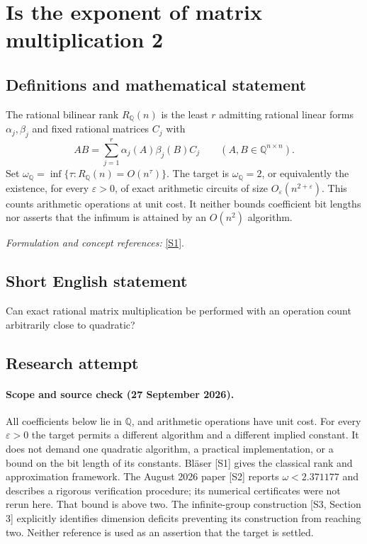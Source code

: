 \documentclass[11pt]{article}
\begin{document}
\section*{\texorpdfstring{Is the exponent of matrix multiplication 2}{Is the exponent of matrix multiplication 2}}\label{3100086}
\subsection{Definitions and mathematical statement}
The rational bilinear rank $R_{{\mathbb{Q}}}(n)$ is the least $r$ admitting rational linear forms $\alpha_j,\beta_j$ and fixed rational matrices $C_j$ with
\[
 AB=\sum_{j=1}^r\alpha_j(A)\beta_j(B)C_j\qquad(A,B\in{\mathbb{Q}}^{n\times n}).
\]
Set $\omega_{{\mathbb{Q}}}=\inf\{\tau:R_{{\mathbb{Q}}}(n)=O(n^\tau)\}$. The target is $\omega_{{\mathbb{Q}}}=2$, or equivalently the existence, for every $\varepsilon>0$, of exact arithmetic circuits of size $O_\varepsilon(n^{2+\varepsilon})$. This counts arithmetic operations at unit cost. It neither bounds coefficient bit lengths nor asserts that the infimum is attained by an $O(n^2)$ algorithm.
\par\smallskip\textit{Formulation and concept references:} \href{https://theoryofcomputing.org/articles/gs005/gs005.pdf}{[S1]}.

\subsection{Short English statement}
Can exact rational matrix multiplication be performed with an operation count arbitrarily close to quadratic?
\subsection{Research attempt}

\paragraph{Scope and source check (27 September 2026).}
All coefficients below lie in $\mathbb Q$, and arithmetic operations have
unit cost. For every $\varepsilon>0$ the target permits a different
algorithm and a different implied constant. It does not demand one
quadratic algorithm, a practical implementation, or a bound on the bit
length of its constants. Bl\"aser [S1] gives the classical rank and
approximation framework. The August 2026 paper [S2] reports
$\omega<2.371177$ and describes a rigorous verification procedure;
its numerical certificates were not rerun here. That bound is above two.
The infinite-group construction [S3, Section 3] explicitly identifies
dimension deficits preventing its construction from reaching two.
Neither reference is used as an assertion that the target is settled.
\end{document}
